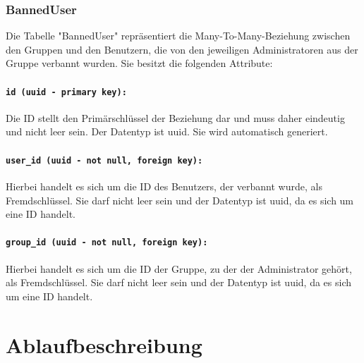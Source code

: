 \documentclass{entwurfsheft}
\begin{document}
\begin{sloppypar}
\subsubsection{BannedUser}
Die Tabelle "BannedUser" repräsentiert die Many-To-Many-Beziehung zwischen den Gruppen und den Benutzern, die von den jeweiligen Administratoren aus der Gruppe verbannt wurden. Sie besitzt die folgenden Attribute:
\paragraph{\texttt{id (uuid - primary key):}} Die ID stellt den Primärschlüssel der Beziehung dar und muss daher eindeutig und nicht leer sein. Der Datentyp ist \Gls{uuid}. Sie wird automatisch generiert.
\paragraph{\texttt{user\_id (uuid - not null, foreign key):}} Hierbei handelt es sich um die ID des Benutzers, der verbannt wurde, als Fremdschlüssel. Sie darf nicht leer sein und der Datentyp ist \Gls{uuid}, da es sich um eine ID handelt.
\paragraph{\texttt{group\_id (uuid - not null, foreign key):}} Hierbei handelt es sich um die ID der Gruppe, zu der der Administrator gehört, als Fremdschlüssel. Sie darf nicht leer sein und der Datentyp ist \Gls{uuid}, da es sich um eine ID handelt.
\newpage

\section{Ablaufbeschreibung}

\end{sloppypar}
\end{document}
